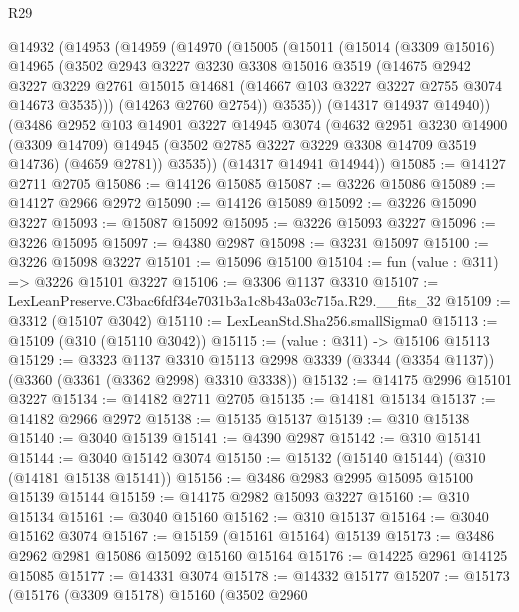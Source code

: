 \begin{lexlean}{R29}
\begin{coremodule}
  @14932
    (@14953
      (@14959
        (@14970
          (@15005
            (@15011
              (@15014
                (@3309 @15016)
                @14965
                (@3502
                  @2943
                  @3227
                  @3230
                  @3308
                  @15016
                  @3519
                  (@14675
                    @2942
                    @3227
                    @3229
                    @2761
                    @15015
                    @14681
                    (@14667 @103 @3227 @3227 @2755 @3074 @14673 @3535)))
                (@14263 @2760 @2754))
              @3535))
          (@14317 @14937 @14940))
        (@3486
          @2952
          @103
          @14901
          @3227
          @14945
          @3074
          (@4632
            @2951
            @3230
            @14900
            (@3309 @14709)
            @14945
            (@3502 @2785 @3227 @3229 @3308 @14709 @3519 @14736)
            (@4659 @2781))
          @3535))
      (@14317 @14941 @14944))
@15085 := @14127 @2711 @2705
@15086 := @14126 @15085
@15087 := @3226 @15086
@15089 := @14127 @2966 @2972
@15090 := @14126 @15089
@15092 := @3226 @15090 @3227
@15093 := @15087 @15092
@15095 := @3226 @15093 @3227
@15096 := @3226 @15095
@15097 := @4380 @2987
@15098 := @3231 @15097
@15100 := @3226 @15098 @3227
@15101 := @15096 @15100
@15104 := fun (value : @311) => @3226 @15101 @3227
@15106 := @3306 @1137 @3310
@15107 := LexLeanPreserve.C3bac6fdf34e7031b3a1c8b43a03c715a.R29.__fits_32
@15109 := @3312 (@15107 @3042)
@15110 := LexLeanStd.Sha256.smallSigma0
@15113 := @15109 (@310 (@15110 @3042))
@15115 := (value : @311) -> @15106 @15113
@15129 := @3323
    @1137
    @3310
    @15113
    @2998
    @3339
    (@3344 (@3354 @1137))
    (@3360 (@3361 (@3362 @2998) @3310 @3338))
@15132 := @14175 @2996 @15101 @3227
@15134 := @14182 @2711 @2705
@15135 := @14181 @15134
@15137 := @14182 @2966 @2972
@15138 := @15135 @15137
@15139 := @310 @15138
@15140 := @3040 @15139
@15141 := @4390 @2987
@15142 := @310 @15141
@15144 := @3040 @15142 @3074
@15150 := @15132 (@15140 @15144) (@310 (@14181 @15138 @15141))
@15156 := @3486 @2983 @2995 @15095 @15100 @15139 @15144
@15159 := @14175 @2982 @15093 @3227
@15160 := @310 @15134
@15161 := @3040 @15160
@15162 := @310 @15137
@15164 := @3040 @15162 @3074
@15167 := @15159 (@15161 @15164) @15139
@15173 := @3486 @2962 @2981 @15086 @15092 @15160 @15164
@15176 := @14225 @2961 @14125 @15085
@15177 := @14331 @3074
@15178 := @14332 @15177
@15207 := @15173
    (@15176
      (@3309 @15178)
      @15160
      (@3502
        @2960

\end{coremodule}
\end{lexlean}
